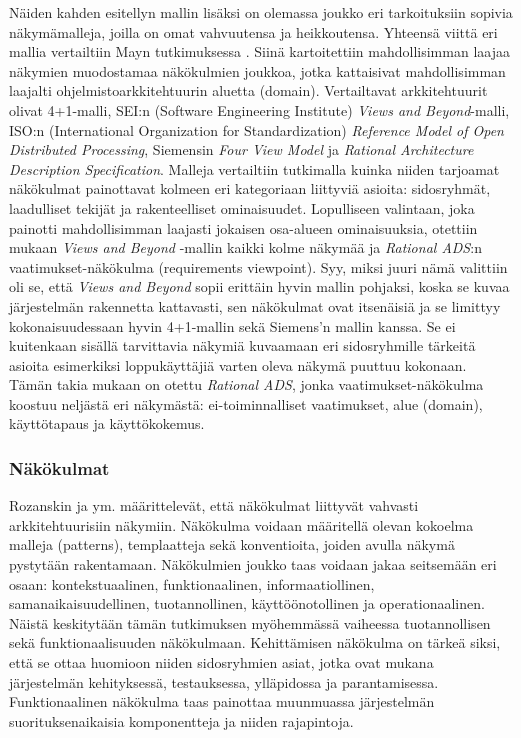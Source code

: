 \documentclass[finnish]{tktltiki2}
\theoremstyle{definition}
\theoremstyle{remark}
\begin{document}
Näiden kahden esitellyn mallin lisäksi on olemassa joukko eri tarkoituksiin sopivia näkymämalleja, joilla on omat vahvuutensa ja heikkoutensa. Yhteensä viittä eri mallia vertailtiin Mayn tutkimuksessa \citep{may2005survey}. Siinä kartoitettiin mahdollisimman laajaa näkymien muodostamaa näkökulmien joukkoa, jotka kattaisivat mahdollisimman laajalti ohjelmistoarkkitehtuurin aluetta (domain). Vertailtavat arkkitehtuurit olivat 4+1-malli, SEI:n (Software Engineering Institute) \textit{Views and Beyond}-malli, ISO:n (International Organization for Standardization) \textit{Reference Model of Open Distributed Processing}, Siemensin \textit{Four View Model} ja \textit{Rational Architecture Description Specification}. Malleja vertailtiin tutkimalla kuinka niiden tarjoamat näkökulmat painottavat kolmeen eri kategoriaan liittyviä asioita: sidosryhmät, laadulliset tekijät ja rakenteelliset ominaisuudet. Lopulliseen valintaan, joka painotti mahdollisimman laajasti jokaisen osa-alueen ominaisuuksia, otettiin mukaan \textit{Views and Beyond} -mallin kaikki kolme näkymää ja \textit{Rational ADS}:n vaatimukset-näkökulma (requirements viewpoint). Syy, miksi juuri nämä valittiin oli se, että \textit{Views and Beyond} sopii erittäin hyvin mallin pohjaksi, koska se kuvaa järjestelmän rakennetta kattavasti, sen näkökulmat ovat itsenäisiä ja se limittyy kokonaisuudessaan hyvin 4+1-mallin sekä Siemens'n mallin kanssa. Se ei kuitenkaan sisällä tarvittavia näkymiä kuvaamaan eri sidosryhmille tärkeitä asioita esimerkiksi loppukäyttäjiä varten oleva näkymä puuttuu kokonaan. Tämän takia mukaan on otettu \textit{Rational ADS}, jonka vaatimukset-näkökulma koostuu neljästä eri näkymästä: ei-toiminnalliset vaatimukset, alue (domain), käyttötapaus ja käyttökokemus. 



\subsubsection{Näkökulmat}
Rozanskin ja ym. \citep[s. 36-42]{Rozanski:2011:SSA:2072649} määrittelevät, että näkökulmat liittyvät vahvasti arkkitehtuurisiin näkymiin. Näkökulma voidaan määritellä olevan kokoelma malleja (patterns), templaatteja sekä konventioita, joiden avulla näkymä pystytään rakentamaan.  Näkökulmien joukko taas voidaan jakaa seitsemään eri osaan: kontekstuaalinen, funktionaalinen, informaatiollinen, samanaikaisuudellinen, tuotannollinen, käyttöönotollinen ja operationaalinen. Näistä keskitytään tämän tutkimuksen myöhemmässä vaiheessa tuotannollisen sekä funktionaalisuuden näkökulmaan. Kehittämisen näkökulma on tärkeä siksi, että se ottaa huomioon niiden sidosryhmien asiat, jotka ovat mukana järjestelmän kehityksessä, testauksessa, ylläpidossa ja parantamisessa. Funktionaalinen näkökulma taas painottaa muunmuassa järjestelmän suorituksenaikaisia komponentteja ja niiden rajapintoja.
\end{document}
